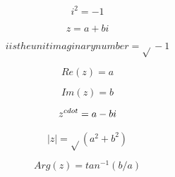 






\[i^{2 }= -1\]

\[z = a + bi\]

\[i is the unit imaginary number = \sqrt{}-1\]

\[Re(z) = a\]

\[Im(z) = b\]

\[z^{\\cdot } = a - bi\]

\[|z| = \sqrt{}(a^{2} + b^{2})\]

\[Arg(z) = tan^{-1}(b/a)\]

